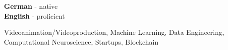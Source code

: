 \documentclass[9pt]{cvstyle}
\begin{document}
\begin{minipage}[t]{0.3\textwidth}
	\vspace{-\baselineskip} 

	
	\textbf{German} - native\\
	\textbf{English} - proficient
\end{minipage}
\begin{minipage}[t]{0.7\textwidth}
	\vspace{-\baselineskip} 

	
	Videoanimation/Videoproduction, Machine Learning, Data Engineering, Computational Neuroscience, Startups, Blockchain
\end{minipage}
\hfill
\end{document}
